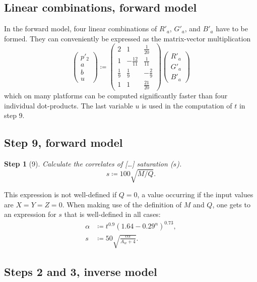 \documentclass[twocolumn]{scrartcl}
\theoremstyle{named}
\newtheorem*{step}{Step}
\begin{document}
\subsection{Linear combinations, forward model}

In the forward model, four linear combinations of $R'_a$, $G'_a$, and $B'_a$
have to be formed. They can conveniently be expressed as the matrix-vector
multiplication
\[
  \begin{pmatrix}
    p'_2\\[0.5ex]
    a\\[0.5ex]
    b\\[0.5ex]
    u
  \end{pmatrix}
  \coloneqq
  \begin{pmatrix}
    2 & 1 & \tfrac{1}{20}\\[0.5ex]
    1 & -\tfrac{12}{11} & \tfrac{1}{11}\\[0.5ex]
    \tfrac{1}{9} & \tfrac{1}{9} & -\tfrac{2}{9}\\[0.5ex]
    1 & 1 & \tfrac{21}{20}
  \end{pmatrix}
  \begin{pmatrix}
    R'_a\\G'_a\\B'_a
  \end{pmatrix}
\]
which on many platforms can be computed significantly faster than four
individual dot-products.
The last variable $u$ is used in the computation of $t$ in step 9.



\subsection{Step 9, forward model}

\begin{step}[9]
  Calculate the correlates of [\dots] saturation ($s$).
  \[
    s \coloneqq 100 \sqrt{M/Q}.
  \]
\end{step}
This expression is not well-defined if $Q=0$, a value occurring if the
input values are $X=Y=Z=0$. When making use of the definition of $M$ and $Q$,
one gets to an expression for $s$ that is well-defined in all cases:
\begin{align}
  \label{eq:alpha}
  \alpha&\coloneqq t^{0.9} {(1.64-0.29^n)}^{0.73},\\
  \nonumber
  s &\coloneqq 50 \sqrt{\frac{c\alpha}{A_w + 4}}.
\end{align}


\subsection{Steps 2 and 3, inverse model}
\end{document}
